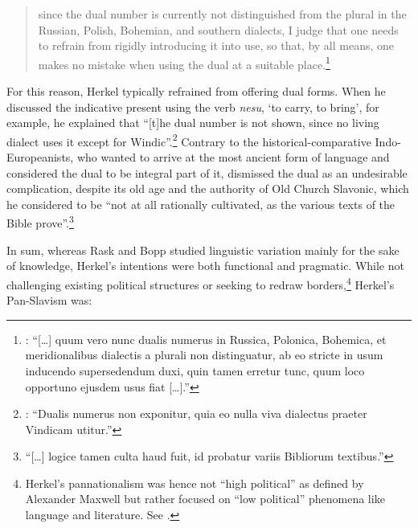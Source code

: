 \begin{quote}
    since the dual number is currently not distinguished from the plural in the Russian, Polish, Bohemian, and southern dialects, I judge that one needs to refrain from rigidly introducing it into use, so that, by all means, one makes no mistake when using the dual at a suitable place.\footnote{\citet[49]{herkel_elementa_1826}: “[…] quum vero nunc dualis numerus in Russica, Polonica, Bohemica, et meridionalibus dialectis a plurali non distinguatur, ab eo stricte in usum inducendo supersedendum duxi, quin tamen erretur tunc, quum loco opportuno ejusdem usus fiat […].”}
\end{quote}

\noindent For this reason, Herkel typically refrained from offering dual forms. When he discussed the indicative present using the verb \textit{nesu}, ‘to carry, to bring’, for example, he explained that “[t]he dual number is not shown, since no living dialect uses it except for Windic”.\footnote{\citet[125]{herkel_elementa_1826}: “Dualis numerus non exponitur, quia eo nulla viva dialectus praeter Vindicam utitur.”} Contrary to the historical-comparative Indo-Europeanists, who wanted to arrive at the most ancient form of language and considered the dual to be integral part of it, \citet[27]{herkel_elementa_1826} dismissed the dual as an undesirable complication, despite its old age and the authority of Old Church Slavonic, which he considered to be “not at all rationally cultivated, as the various texts of the Bible prove”.\footnote{“[…] logice tamen culta haud fuit, id probatur variis Bibliorum textibus.”}

In sum, whereas Rask and Bopp studied linguistic variation mainly for the sake of knowledge, Herkel’s intentions were both functional and pragmatic. While not challenging existing political structures or seeking to redraw borders,\footnote{Herkel’s pannationalism was hence not “high political” as defined by Alexander Maxwell but rather focused on “low political” phenomena like language and literature. See \citet{maxwell_pan-nationalism_2022}.} Herkel’s Pan-Slavism was:


